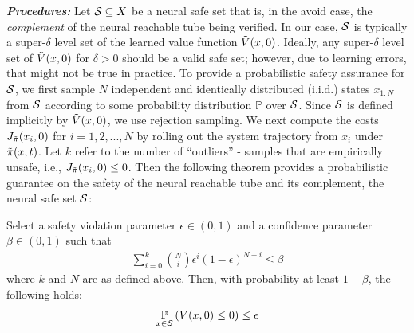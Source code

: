 \noindent \textit{\textbf{Procedures:}}
Let $\mathcal{S} \subseteq X$ be a neural safe set that is, in the avoid case, the \textit{complement} of the neural reachable tube being verified.
In our case, $\mathcal{S}$ is typically a super-$\delta$ level set of the learned value function $\Tilde{V}(x,0)$.
Ideally, any super-$\delta$ level set of $\Tilde{V}(x,0)$ for $\delta > 0$ should be a valid safe set; however, due to learning errors, that might not be true in practice.
To provide a probabilistic safety assurance for $\mathcal{S}$, we first sample $N$ independent and identically distributed (i.i.d.) states $x_{1:N}$ from $\mathcal{S}$ according to some probability distribution $\mathbb{P}$ over $\mathcal{S}$.
Since $\mathcal{S}$ is defined implicitly by $\Tilde{V}(x,0)$, we use rejection sampling.
We next compute the costs $J_{\Tilde{\pi}}(x_i,0)$ for $i=1, 2, ..., N$ by rolling out the system trajectory from $x_i$ under $\Tilde{\pi}(x,t)$.
Let $k$ refer to the number of ``outliers'' - samples that are empirically unsafe, i.e., $J_{\Tilde{\pi}}(x_i,0) \le 0$.
Then the following theorem provides a probabilistic guarantee on the safety of the neural reachable tube and its complement, the neural safe set $\mathcal{S}$: 
% 
\vspace{-0.5em}
\begin{theorem}
    \label{theorem:scenario-based_method}
    Select a safety violation parameter $\epsilon \in (0, 1)$ and a confidence parameter $\beta \in (0, 1)$ such that
    \vspace{-0.5em}
    \begin{equation} \label{eq:theorem_parameters_relationship}
        \begin{aligned}
            \sum^k_{i=0} \binom{N}{i} \epsilon^i (1-\epsilon)^{N-i} \le \beta
        \end{aligned}
    \end{equation}
    where $k$ and $N$ are as defined above. 
    Then, with probability at least $1-\beta$, the following holds:
    \begin{equation} \label{eq:robust_guarantee}
        \begin{aligned}
            \underset{x \in \mathcal{S}}{\mathbb{P}} \left( V(x,0) \le 0 \right) \le \epsilon
        \end{aligned}
    \end{equation}
\end{theorem}
